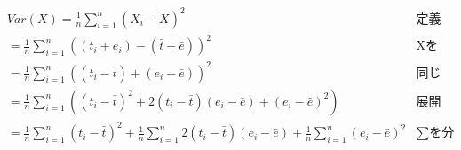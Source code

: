 \begin{align*}
	 & Var(X)  =  \frac{1}{n}\sum_{i=1}^n (X_i - \bar{X})^2                                                                                              & \mbox{定義より}         \\
	 & = \frac{1}{n}\sum_{i=1}^n  ((t_i + e_i) - (\bar{t} + \bar{e}))^2                                                                                  & \mbox{Xをテスト理論のモデルに} \\
	 & = \frac{1}{n}\sum_{i=1}^n (  (t_i - \bar{t}) + (e_i - \bar{e}) )^2                                                                                & \mbox{同じ記号でまとめる}    \\
	 & = \frac{1}{n}\sum_{i=1}^n (  (t_i - \bar{t})^2 + 2(t_i - \bar{t})(e_i - \bar{e}) + (e_i - \bar{e})^2  )                                           & \mbox{展開する}         \\
	 & = \frac{1}{n}\sum_{i=1}^n (t_i - \bar{t})^2 +\frac{1}{n}\sum_{i=1}^n 2(t_i - \bar{t})(e_i - \bar{e})  + \frac{1}{n}\sum_{i=1}^n (e_i - \bar{e})^2 & \mbox{$\sum$を分配}    \\
\end{align*}
